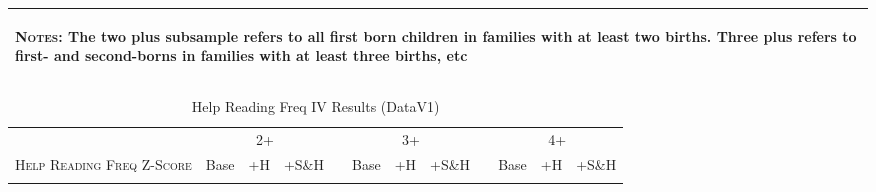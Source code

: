 \begin{landscape}
\begin{table}[htpb!]
\begin{center}
\begin{tabular}{lcccp{2mm}cccp{2mm}ccc}
\midrule\multicolumn{12}{p{19.2cm}}{\begin{footnotesize}\textsc{Notes:} The two plus subsample refers to all first born children in families with at least two births.  Three plus refers to first- and second-borns in families with at least three births, etc\end{footnotesize}} \\ \bottomrule 
\end{tabular}\end{center}\end{table}\end{landscape}\begin{landscape}\begin{table}[htpb!]\caption{Help Reading Freq IV Results (DataV1)}
\label{TWINtab:IVAll}
\begin{center}\begin{tabular}{lcccp{2mm}cccp{2mm}ccc}
\toprule \toprule 
&\multicolumn{3}{c}{2+}&&\multicolumn{3}{c}{3+}&&\multicolumn{3}{c}{4+}\\ \cmidrule(r){2-4} \cmidrule(r){6-8} \cmidrule(r){10-12} 
\textsc{Help Reading Freq Z-Score}&Base&+H&+S\&H&&Base&+H&+S\&H&&Base&+H&+S\&H\\ \midrule 
\begin{footnotesize}\end{footnotesize}& 
\begin{footnotesize}\end{footnotesize}& 
\begin{footnotesize}\end{footnotesize}& 
\begin{footnotesize}\end{footnotesize}& 
\begin{footnotesize}\end{footnotesize}& 
\begin{footnotesize}\end{footnotesize}& 
\begin{footnotesize}\end{footnotesize}& 
\begin{footnotesize}\end{footnotesize}& 
\begin{footnotesize}\end{footnotesize}& 
\begin{footnotesize}\end{footnotesize}& 
\begin{footnotesize}\end{footnotesize}& 
\begin{footnotesize}\end{footnotesize}\\ 

\end{tabular}
\end{center}
\end{table}
\end{landscape}
